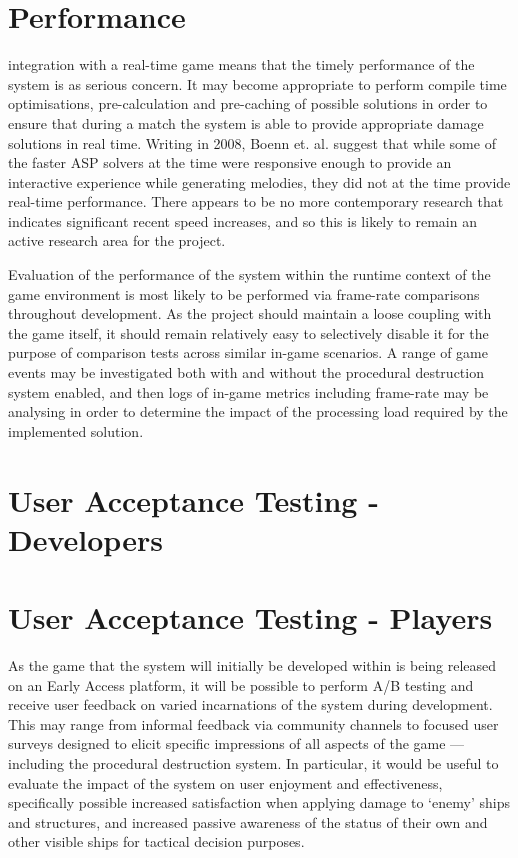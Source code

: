 \documentclass[11pt]{report}
\begin{document}
	\section{Performance}
		integration with a real-time game means that the timely performance of the system is as serious concern. It may become appropriate to perform compile time optimisations, pre-calculation and pre-caching of possible solutions in order to ensure that during a match the system is able to provide appropriate damage solutions in real time. 
		Writing in 2008, Boenn et. al. \cite{boenn2008automatic} suggest that while some of the faster ASP solvers at the time were responsive enough to provide an interactive experience while generating melodies, they did not at the time provide real-time performance. There appears to be no more contemporary research that indicates significant recent speed increases, and so this is likely to remain an active research area for the project.

		Evaluation of the performance of the system within the runtime context of the game environment is most likely to be performed via frame-rate comparisons throughout development. As the project should maintain a loose coupling with the game itself, it should remain relatively easy to selectively disable it for the purpose of comparison tests across similar in-game scenarios. A range of game events may be investigated both with and without the procedural destruction system enabled, and then logs of in-game metrics including frame-rate may be analysing in order to determine the impact of the processing load required by the implemented solution.

	\section{User Acceptance Testing - Developers}

	\section{User Acceptance Testing - Players}
		As the game that the system will initially be developed within is being released on an Early Access platform, it will be possible to perform A/B testing and receive user feedback on varied incarnations of the system during development. This may range from informal feedback via community channels to focused user surveys designed to elicit specific impressions of all aspects of the game --- including the procedural destruction system. In particular, it would be useful to evaluate the impact of the system on user enjoyment and effectiveness, specifically possible increased satisfaction when applying damage to `enemy' ships and structures, and increased passive awareness of the status of their own and other visible ships for tactical decision purposes.
\end{document}
